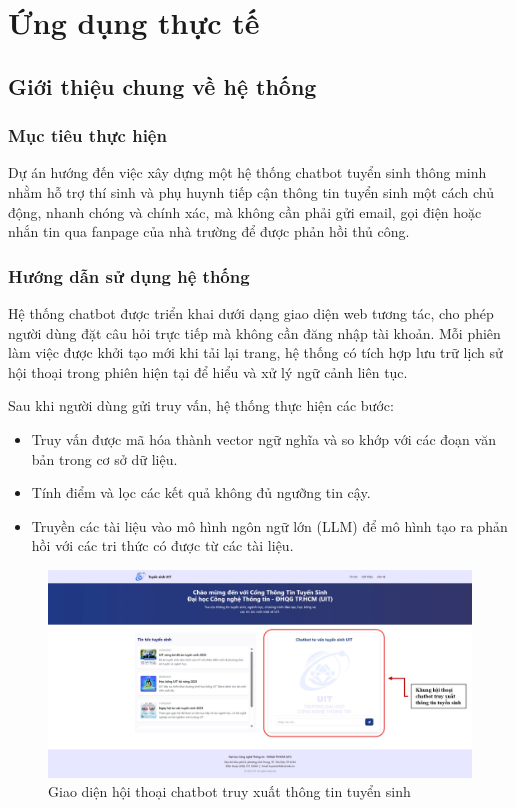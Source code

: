 \chapter{Ứng dụng thực tế}
\section{Giới thiệu chung về hệ thống}

\subsection{Mục tiêu thực hiện}

Dự án hướng đến việc xây dựng một hệ thống chatbot tuyển sinh thông minh nhằm hỗ trợ thí sinh và phụ huynh tiếp cận thông tin tuyển sinh một cách chủ động, nhanh chóng và chính xác, mà không cần phải gửi email, gọi điện hoặc nhắn tin qua fanpage của nhà trường để được phản hồi thủ công.

\subsection{Hướng dẫn sử dụng hệ thống}

Hệ thống chatbot được triển khai dưới dạng giao diện web tương tác, cho phép người dùng đặt câu hỏi trực tiếp mà không cần đăng nhập tài khoản. Mỗi phiên làm việc được khởi tạo mới khi tải lại trang, hệ thống có tích hợp lưu trữ lịch sử hội thoại trong phiên hiện tại để hiểu và xử lý ngữ cảnh liên tục.

Sau khi người dùng gửi truy vấn, hệ thống thực hiện các bước:
\begin{itemize}
    \item Truy vấn được mã hóa thành vector ngữ nghĩa và so khớp với các đoạn văn bản trong cơ sở dữ liệu.
    \item Tính điểm và lọc các kết quả không đủ ngưỡng tin cậy.
    \item Truyền các tài liệu vào mô hình ngôn ngữ lớn (LLM) để mô hình tạo ra phản hồi với các tri thức có được từ các tài liệu.
\end{itemize}

\begin{figure}[H]
    \caption{Giao diện hội thoại chatbot truy xuất thông tin tuyển sinh}
    \begin{center}
    \includegraphics[width=\linewidth]{assets/app_demo.png}
    \end{center}
\end{figure}

